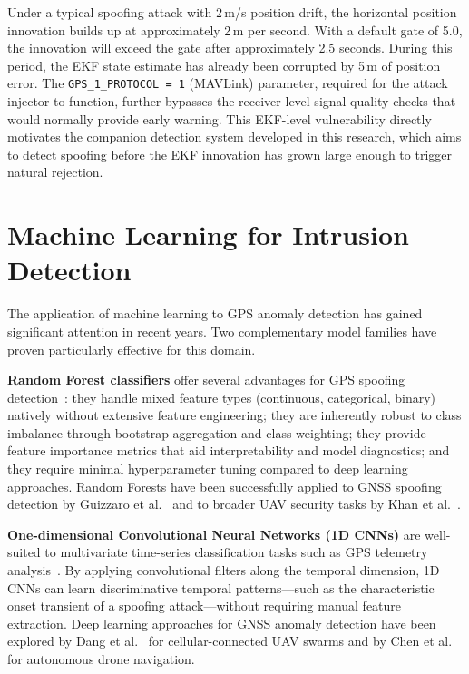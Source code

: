 Under a typical spoofing attack with 2\,m/s position drift, the horizontal position innovation builds up at approximately 2\,m per second. With a default gate of 5.0, the innovation will exceed the gate after approximately 2.5 seconds. During this period, the EKF state estimate has already been corrupted by 5\,m of position error. The \texttt{GPS\_1\_PROTOCOL = 1} (MAVLink) parameter, required for the attack injector to function, further bypasses the receiver-level signal quality checks that would normally provide early warning. This EKF-level vulnerability directly motivates the companion detection system developed in this research, which aims to detect spoofing before the EKF innovation has grown large enough to trigger natural rejection.

\section{Machine Learning for Intrusion Detection}

The application of machine learning to GPS anomaly detection has gained significant attention in recent years. Two complementary model families have proven particularly effective for this domain.

\textbf{Random Forest classifiers} offer several advantages for GPS spoofing detection~\cite{Li2022}: they handle mixed feature types (continuous, categorical, binary) natively without extensive feature engineering; they are inherently robust to class imbalance through bootstrap aggregation and class weighting; they provide feature importance metrics that aid interpretability and model diagnostics; and they require minimal hyperparameter tuning compared to deep learning approaches. Random Forests have been successfully applied to GNSS spoofing detection by Guizzaro et al.~\cite{Guizzaro2022} and to broader UAV security tasks by Khan et al.~\cite{Khan2021}.

\textbf{One-dimensional Convolutional Neural Networks (1D CNNs)} are well-suited to multivariate time-series classification tasks such as GPS telemetry analysis~\cite{Zhang2023}. By applying convolutional filters along the temporal dimension, 1D CNNs can learn discriminative temporal patterns---such as the characteristic onset transient of a spoofing attack---without requiring manual feature extraction. Deep learning approaches for GNSS anomaly detection have been explored by Dang et al.~\cite{Dang2023} for cellular-connected UAV swarms and by Chen et al.~\cite{Chen2023} for autonomous drone navigation.

